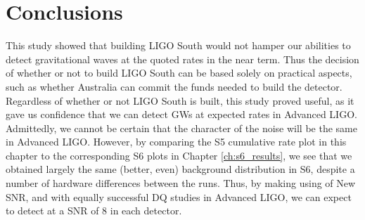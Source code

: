 \section{Conclusions}

This study showed that building \ac{LIGO} South would not hamper our abilities
to detect gravitational waves at the quoted rates in the near term. Thus the
decision of whether or not to build \ac{LIGO} South can be based solely on
practical aspects, such as whether Australia can commit the funds needed to
build the detector. Regardless of whether or not \ac{LIGO} South is built, this
study proved useful, as it gave us confidence that we can detect \acp{GW} at
expected rates in Advanced LIGO. Admittedly, we cannot be certain that the
character of the noise will be the same in Advanced LIGO. However, by comparing
the \ac{S5} cumulative rate plot in this chapter to the corresponding \ac{S6}
plots in Chapter \ref{ch:s6_results}, we see that we obtained largely the same
(better, even) background distribution in \ac{S6}, despite a number of hardware
differences between the runs. Thus, by making using of New \ac{SNR}, and with
equally successful \ac{DQ} studies in Advanced \ac{LIGO}, we can expect to
detect at a \ac{SNR} of $8$ in each detector.

